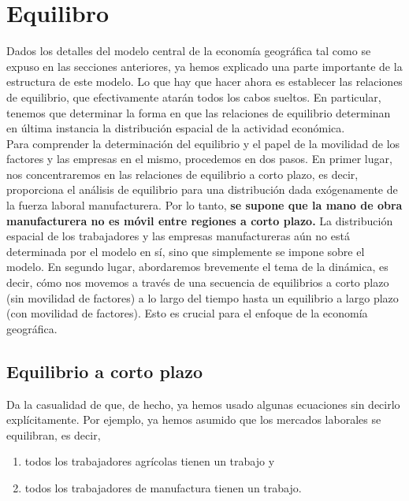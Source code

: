 \section{Equilibro}
Dados los detalles del modelo central de la economía geográfica tal como se expuso en las secciones anteriores, ya hemos explicado una parte importante de la estructura de este modelo. Lo que hay que hacer ahora es establecer las relaciones de equilibrio, que efectivamente atarán todos los cabos sueltos. En particular, tenemos que determinar la forma en que las relaciones de equilibrio  determinan en última instancia la distribución espacial de la actividad económica.\\ 
Para comprender la determinación del equilibrio y el papel de la movilidad de los factores y las empresas en el mismo, procedemos en dos pasos. En primer lugar, nos concentraremos en las relaciones de equilibrio a corto plazo, es decir, proporciona el análisis de equilibrio para una distribución dada exógenamente de la fuerza laboral manufacturera. Por lo tanto, \textbf{se supone que la mano de obra manufacturera no es móvil entre regiones a corto plazo.} La distribución espacial de los trabajadores y las empresas manufactureras aún no está determinada por el modelo en sí, sino que simplemente se impone sobre el modelo. En segundo lugar, abordaremos brevemente el tema de la dinámica, es decir, cómo nos movemos a través de una secuencia de equilibrios a corto plazo (sin movilidad de factores) a lo largo del tiempo hasta un equilibrio a largo plazo (con movilidad de factores). Esto es crucial para el enfoque de la economía geográfica. 


\subsection{Equilibrio a corto plazo}
Da la casualidad de que, de hecho, ya hemos usado algunas ecuaciones  sin decirlo explícitamente. Por ejemplo, ya hemos asumido que los mercados laborales se equilibran, es decir, 

\begin{enumerate}[\bfseries (i)]
    \item todos los trabajadores agrícolas tienen un trabajo y 
    \item todos los trabajadores de manufactura tienen un trabajo. 
\end{enumerate}


